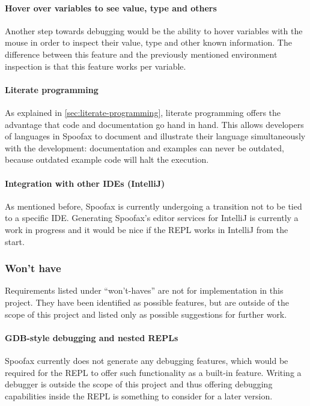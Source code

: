 \paragraph{Hover over variables to see value, type and others} Another step
towards debugging would be the ability to hover variables with the mouse in
order to inspect their value, type and other known information. The difference
between this feature and the previously mentioned environment inspection is that
this feature works per variable.

\paragraph{Literate programming} As explained in
\cref{sec:literate-programming}, literate programming offers the advantage that
code and documentation go hand in hand. This allows developers of languages in
Spoofax to document and illustrate their language simultaneously with the
development: documentation and examples can never be outdated, because outdated
example code will halt the execution.

\paragraph{Integration with other IDEs (IntelliJ)} As mentioned before, Spoofax
is currently undergoing a transition not to be tied to a specific IDE.
Generating Spoofax's editor services for IntelliJ is currently a work in
progress and it would be nice if the REPL works in IntelliJ from the start.

\subsubsection{Won't have}

Requirements listed under ``won't-haves'' are not for implementation in this
project. They have been identified as possible features, but are outside of the
scope of this project and listed only as possible suggestions for further work.

\paragraph{GDB-style debugging and nested REPLs} Spoofax currently does not
generate any debugging features, which would be required for the REPL to offer
such functionality as a built-in feature. Writing a debugger is outside
the scope of this project and thus offering debugging capabilities inside
the REPL is something to consider for a later version.

